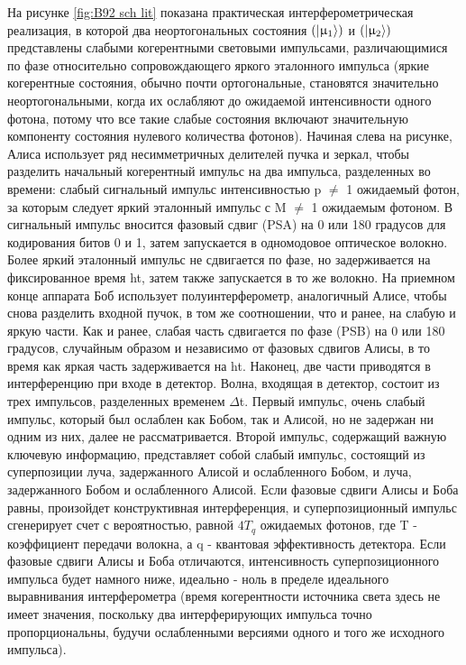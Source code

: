 На рисунке \ref{fig:B92 sch lit} показана практическая интерферометрическая реализация, в которой два неортогональных состояния $(\lvert\upmu_1\rangle)$ и $(\lvert\upmu_2\rangle)$ представлены слабыми когерентными световыми импульсами, различающимися по фазе относительно сопровождающего яркого эталонного импульса (яркие когерентные состояния, обычно почти ортогональные, становятся значительно неортогональными, когда их ослабляют до ожидаемой интенсивности одного фотона, потому что все такие слабые состояния включают значительную компоненту состояния нулевого количества фотонов). Начиная слева на рисунке, Алиса использует ряд несимметричных делителей пучка и зеркал, чтобы разделить начальный когерентный импульс на два импульса, разделенных во времени: слабый сигнальный импульс интенсивностью p $\neq$ 1 ожидаемый фотон, за которым следует яркий эталонный импульс с M $\neq$ 1 ожидаемым фотоном. В сигнальный импульс вносится фазовый сдвиг (PSA) на 0 или 180 градусов для кодирования битов 0 и 1, затем запускается в одномодовое оптическое волокно. Более яркий эталонный импульс не сдвигается по фазе, но задерживается на фиксированное время ht, затем также запускается в то же волокно. На приемном конце аппарата Боб использует полуинтерферометр, аналогичный Алисе, чтобы снова разделить входной пучок, в том же соотношении, что и ранее, на слабую и яркую части. Как и ранее, слабая часть сдвигается по фазе (PSB) на 0 или 180 градусов, случайным образом и независимо от фазовых сдвигов Алисы, в то время как яркая часть задерживается на ht. Наконец, две части приводятся в интерференцию при входе в детектор.
Волна, входящая в детектор, состоит из трех импульсов, разделенных временем $\Delta$t. Первый импульс, очень слабый импульс, который был ослаблен как Бобом, так и Алисой, но не задержан ни одним из них, далее не рассматривается.
Второй импульс, содержащий важную ключевую информацию, представляет собой слабый импульс, состоящий из суперпозиции луча, задержанного Алисой и ослабленного Бобом, и луча, задержанного Бобом и ослабленного Алисой. Если фазовые сдвиги Алисы и Боба равны, произойдет конструктивная интерференция, и суперпозиционный импульс сгенерирует счет с вероятностью, равной $4T_q$ ожидаемых фотонов, где T - коэффициент передачи волокна, а q - квантовая эффективность детектора. Если фазовые сдвиги Алисы и Боба отличаются, интенсивность суперпозиционного импульса будет намного ниже, идеально - ноль в пределе идеального выравнивания интерферометра (время когерентности источника света здесь не имеет значения, поскольку два интерферирующих импульса точно пропорциональны, будучи ослабленными версиями одного и того же исходного импульса).
